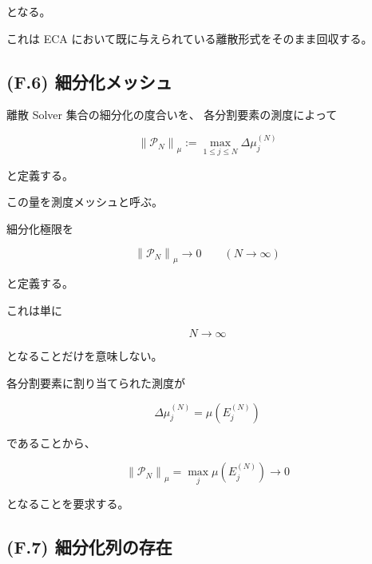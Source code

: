 \documentclass[a4paper,11pt]{article}
\begin{document}
となる。

これは ECA において既に与えられている離散形式をそのまま回収する。


\subsection{(F.6) 細分化メッシュ}
\label{subsec:F6}

離散 Solver 集合の細分化の度合いを、
各分割要素の測度によって

\begin{equation}
    \boxed{
        \left\|
        \mathcal{P}_N
        \right\|_\mu
        :=
        \max_{1\leq j\leq N}
        \Delta\mu_j^{(N)}
    }
    \label{eq:F-measure-mesh}
\end{equation}

と定義する。

この量を測度メッシュと呼ぶ。

細分化極限を

\begin{equation}
    \boxed{
        \left\|
        \mathcal{P}_N
        \right\|_\mu
        \longrightarrow
        0
        \qquad
        (N\to\infty)
    }
    \label{eq:F-mesh-limit}
\end{equation}

と定義する。

これは単に

\begin{equation}
    N\to\infty
\end{equation}

となることだけを意味しない。

各分割要素に割り当てられた測度が

\begin{equation}
    \Delta\mu_j^{(N)}
    =
    \mu\!\left(E_j^{(N)}\right)
\end{equation}

であることから、

\begin{equation}
    \left\|
    \mathcal{P}_N
    \right\|_\mu
    =
    \max_j
    \mu\!\left(E_j^{(N)}\right)
    \longrightarrow0
\end{equation}

となることを要求する。


\subsection{(F.7) 細分化列の存在}
\label{subsec:F7}
\end{document}
